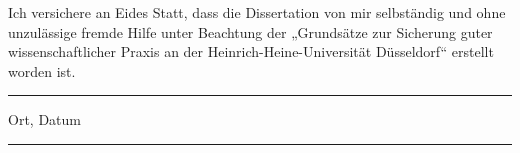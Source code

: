 \label{sec:declaration}
\thispagestyle{empty}
%
Ich versichere an Eides Statt, dass die Dissertation von mir selbst{\"a}ndig und ohne unzul{\"a}ssige fremde Hilfe unter Beachtung der „Grunds{\"a}tze zur Sicherung guter wissenschaftlicher Praxis an der Heinrich-Heine-Universit{\"a}t D{\"u}sseldorf“ erstellt worden ist. \\[2cm]
%
\begin{minipage}{5cm}
	\rule{\textwidth}{1pt}
	\centering Ort, Datum
\end{minipage}
\hfill
\begin{minipage}{5cm}
	\rule{\textwidth}{1pt}
	\centering\thesisName
\end{minipage}